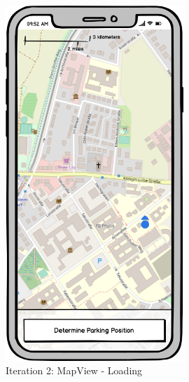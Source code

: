\begin{figure}[H]
  \centering
  \begin{minipage}[b]{0.45\textwidth}
    \centering
    \includegraphics[width=0.6\textwidth]{images/UI/Iteration2-MapView-Loading.png}
    \caption{Iteration 2: MapView - Loading}
    \label{fig:i2-mv-loading}
  \end{minipage}
  \hfill
  \begin{minipage}[b]{0.45\textwidth}
    \centering

\end{minipage}
\end{figure}
